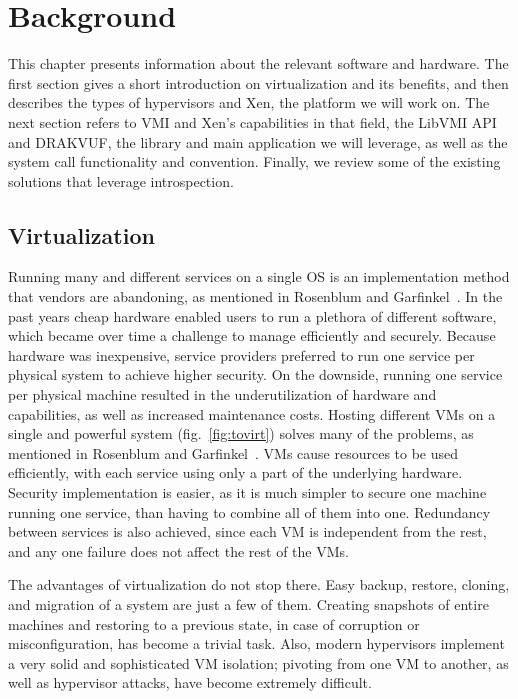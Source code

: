 
\chapter{Background}\label{ch:background}

This chapter presents information about the relevant software and hardware. The first section gives a short introduction on virtualization and its benefits, and then describes the types of hypervisors and Xen, the platform we will work on. The next section refers to \ac{VMI} and Xen's capabilities in that field, the LibVMI \ac{API} and DRAKVUF, the library and main application we will leverage, as well as the system call functionality and convention. Finally, we review some of the existing solutions that leverage introspection.

\section{Virtualization}\label{sec:virtualization}
Running many and different services on a single \ac{OS} is an implementation method that vendors are abandoning, as mentioned in Rosenblum and Garfinkel~\cite{rosenblum2005virtual}. In the past years cheap hardware enabled users to run a plethora of different software, which became over time a challenge to manage efficiently and securely. Because hardware was inexpensive, service providers preferred to run one service per physical system to achieve higher security. On the downside, running one service per physical machine resulted in the underutilization of hardware and capabilities, as well as increased maintenance costs. Hosting different \ac{VM}s on a single and powerful system (fig.~\ref{fig:tovirt}) solves many of the problems, as mentioned in Rosenblum and Garfinkel~\cite{rosenblum2005virtual}. \ac{VM}s cause resources to be used efficiently, with each service using only a part of the underlying hardware. Security implementation is easier, as it is much simpler to secure one machine running one service, than having to combine all of them into one. Redundancy between services is also achieved, since each \ac{VM} is independent from the rest, and any one failure does not affect the rest of the \ac{VM}s.

\par The advantages of virtualization do not stop there. Easy backup, restore, cloning, and migration of a system are just a few of them. Creating snapshots of entire machines and restoring to a previous state, in case of corruption or misconfiguration, has become a trivial task. Also, modern hypervisors implement a very solid and sophisticated \ac{VM} isolation; pivoting from one \ac{VM} to another, as well as hypervisor attacks, have become extremely difficult.

